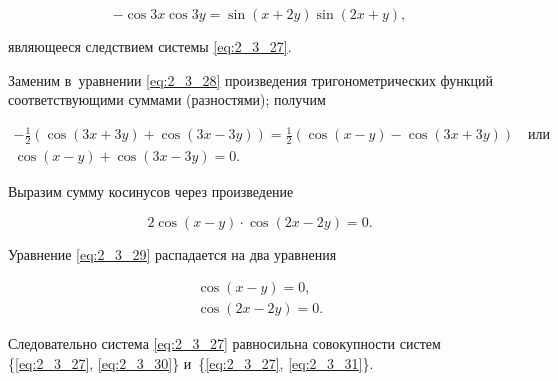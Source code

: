 \begin{equation}\label{eq:2_3_28}
-\cos 3x \cos 3y = \sin (x + 2y) \sin (2x + y),
\end{equation}

\noindent
являющееся следствием системы \eqref{eq:2_3_27}.

Заменим в~уравнении \eqref{eq:2_3_28} произведения тригонометрических функций
соответствующими суммами (разностями); получим

\begin{gather*}
\displaystyle -\frac{1}{2}
\left(
\cos (3x + 3y) + \cos (3x - 3y)
\right) =
\frac{1}{2} 
\left(
\cos (x - y) - \cos (3x + 3y)
\right) \quad \text{или} \\
\cos (x - y) + \cos (3x - 3y) = 0.
\end{gather*}

\noindent
Выразим сумму косинусов через произведение

\begin{equation}\label{eq:2_3_29}
2 \cos (x - y) \cdot \cos (2x - 2y) = 0.
\end{equation}

\noindent
Уравнение \eqref{eq:2_3_29} распадается на два уравнения

\begin{gather}
\cos (x - y) = 0, \label{eq:2_3_30} \\
\cos (2x - 2y) = 0. \label{eq:2_3_31}
\end{gather}

\noindent
Следовательно система \eqref{eq:2_3_27} равносильна совокупности систем
\{\eqref{eq:2_3_27}, \eqref{eq:2_3_30}\} и~\{\eqref{eq:2_3_27}, \eqref{eq:2_3_31}\}.

